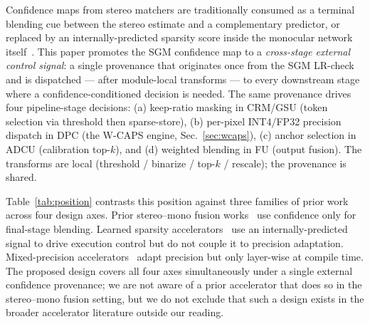 \documentclass[journal]{IEEEtran}
\begin{document}
Confidence maps from stereo matchers are traditionally consumed as a terminal blending cue between the stereo estimate and a complementary predictor, or replaced by an internally-predicted sparsity score inside the monocular network itself~\cite{you2023vitcod,wang2021spatten}. This paper promotes the SGM confidence map to a \emph{cross-stage external control signal}: a single provenance that originates once from the SGM LR-check~\cite{poggi2016pkrn} and is dispatched --- after module-local transforms --- to every downstream stage where a confidence-conditioned decision is needed. The same provenance drives four pipeline-stage decisions: (a) keep-ratio masking in CRM/GSU (token selection via threshold then sparse-store), (b) per-pixel INT4/FP32 precision dispatch in DPC (the W-CAPS engine, Sec.~\ref{sec:wcaps}), (c) anchor selection in ADCU (calibration top-$k$), and (d) weighted blending in FU (output fusion). The transforms are local (threshold / binarize / top-$k$ / rescale); the provenance is shared.

Table~\ref{tab:position} contrasts this position against three families of prior work across four design axes. Prior stereo--mono fusion works~\cite{facil2019camconvs,wang2019pseudolidar,poggi2016pkrn} use confidence only for final-stage blending. Learned sparsity accelerators~\cite{you2023vitcod,wang2021spatten} use an internally-predicted signal to drive execution control but do not couple it to precision adaptation. Mixed-precision accelerators~\cite{sharma2018bitfusion,park2019olaccel} adapt precision but only layer-wise at compile time. The proposed design covers all four axes simultaneously under a single external confidence provenance; we are not aware of a prior accelerator that does so in the stereo--mono fusion setting, but we do not exclude that such a design exists in the broader accelerator literature outside our reading.
\end{document}
